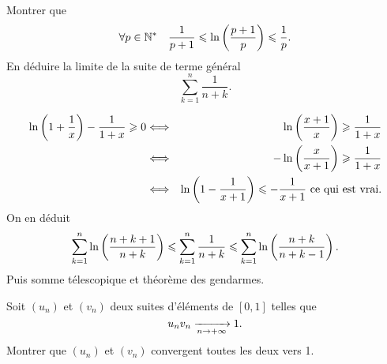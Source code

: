 \documentclass{magnolia}
\begin{document}
\begin{questions}
\question Montrer que
   \[\forall p\in{\mathbb{N}^*} \quad
     \frac{1}{p+1} \leqslant \ln\left(\frac{p+1}{p}\right) \leqslant \frac{1}{p}.\]
\question En déduire la limite de la suite de terme général
   \[\sum_{k=1}^n \frac{1}{n+k}.\]
\end{questions}
\begin{sol}
\begin{questions}
\question
\begin{eqnarray*}\ln\left(1+\frac{1}{x}\right)-\frac{1}{1+x}\geqslant 0 &\Longleftrightarrow & \ln\left(\frac{x+1}{x}\right)\geqslant\frac{1}{1+x}\\
&\Longleftrightarrow & -\ln\left(\frac{x}{x+1}\right)\geqslant\frac{1}{1+x}\\
&\Longleftrightarrow & \ln\left(1-\frac{1}{x+1}\right)\leqslant-\frac{1}{x+1} \text{ ce qui est vrai.}
\end{eqnarray*}
\question On en déduit
   \[\sum_{k=1}^n\ln\left(\frac{n+k+1}{n+k}\right) \leqslant \sum_{k=1}^n \frac{1}{n+k}\leqslant \sum_{k=1}^n\ln\left(\frac{n+k}{n+k-1}\right).\]
   Puis somme télescopique et théorème des gendarmes.
\end{questions}
\end{sol}

Soit $(u_n)$ et $(v_n)$ deux suites d'éléments de $[0,1]$ telles que
\[u_n v_n\xrightarrow[n\rightarrow +\infty]{} 1.\]
Montrer que $(u_n)$ et $(v_n)$ convergent toutes les deux vers 1.











\end{document}
